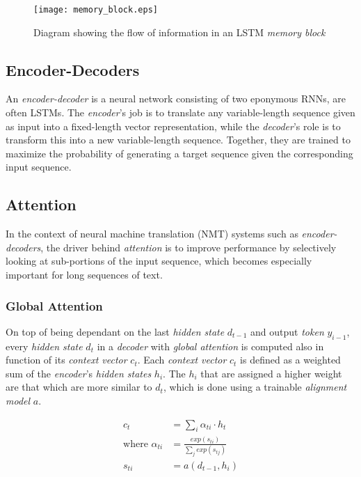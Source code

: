 \begin{figure}[H]
\centering
\texttt{[image: memory\_block.eps]}
\caption{\cite{graves_hybrid_2013} Diagram showing the flow of information in an LSTM \textit{memory block}}
\label{fig:memory_block}
\end{figure}

\subsection{Encoder-Decoders}

An \textit{encoder-decoder} is a neural network consisting of two eponymous RNNs, are often LSTMs. The \textit{encoder}'s job is to translate any variable-length sequence given as input into a fixed-length vector representation, while the \textit{decoder}'s role is to transform this into a new variable-length sequence. Together, they are trained to maximize the probability of generating a target sequence given the corresponding input sequence. \cite{cho_learning_2014}

\subsection{Attention}

In the context of neural machine translation (NMT) systems such as \textit{encoder-decoders}, the driver behind \textit{attention} is to improve performance by selectively looking at sub-portions of the input sequence, which becomes especially important for long sequences of text. \cite{yao_dual_2018}

\subsubsection{Global Attention}

On top of being dependant on the last \textit{hidden state} $d_{t-1}$ and output \textit{token} $y_{i-1}$, every \textit{hidden state} $d_t$ in a \textit{decoder} with \textit{global attention} is computed also in function of its \textit{context vector} $c_t$. Each \textit{context vector} $c_t$ is defined as a weighted sum of the \textit{encoder}'s \textit{hidden states} $h_i$. The $h_i$ that are assigned a higher weight are that which are more similar to $d_t$, which is done using a trainable \textit{alignment model} $a$. \cite{bahdanau_neural_2016}

\begin{equation}
\begin{aligned}
c_t &= \sum_{i} \alpha_{ti} \cdot h_t \\
\mbox{where } \alpha_{ti} &= \frac{exp(s_{ti})}{\sum_{j} exp(s_{tj})} \\
s_{ti} &= a(d_{t-1},h_i)
\end{aligned}
\end{equation}

